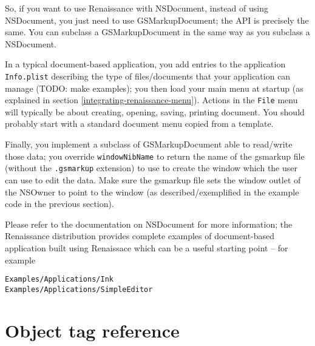 So, if you want to use Renaissance with NSDocument, instead of using
NSDocument, you just need to use GSMarkupDocument; the API is
precisely the same.  You can subclass a GSMarkupDocument in the same
way as you subclass a NSDocument.

In a typical document-based application, you add entries to the
application \texttt{Info.plist} describing the type of files/documents
that your application can manage (TODO: make examples); you then load
your main menu at startup (as explained in section
\ref{integrating-renaissance-menu}).  Actions in the \texttt{File}
menu will typically be about creating, opening, saving, printing
document.  You should probably start with a standard document menu
copied from a template.

Finally, you implement a subclass of GSMarkupDocument able to
read/write those data; you override \texttt{windowNibName} to return
the name of the gsmarkup file (without the \texttt{.gsmarkup}
extension) to use to create the window which the user can use to edit
the data.  Make sure the gsmarkup file sets the window outlet of the
NSOwner to point to the window (as described/exemplified in the
example code in the previous section).

Please refer to the documentation on NSDocument for more information;
the Renaissance distribution provides complete examples of
document-based application built using Renaissace which can be a
useful starting point -- for example
\begin{verbatim}
Examples/Applications/Ink
Examples/Applications/SimpleEditor
\end{verbatim}



\section{Object tag reference}

